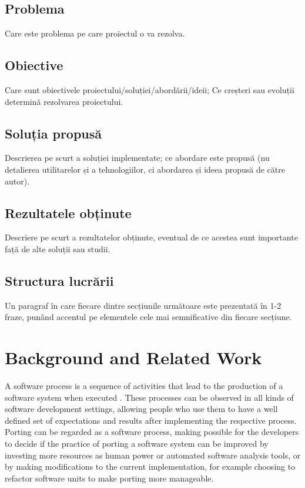 \documentclass[12pt,a4paper]{report}
\begin{document}
\section{Problema}
Care este problema pe care proiectul o va rezolva.
\section{Obiective}
Care sunt obiectivele proiectului/soluției/abordării/ideii; Ce creșteri sau evoluții determină rezolvarea proiectului.
\section{Soluția propusă}
Descrierea pe scurt a soluției implementate; ce abordare este propusă (nu detalierea utilitarelor și a tehnologiilor, ci abordarea și ideea propusă de către autor).
\section{Rezultatele obținute}
Descriere pe scurt a rezultatelor obținute, eventual de ce acestea sunt importante față de alte soluții sau studii.
\section{Structura lucrării}
Un paragraf în care fiecare dintre secțiunile următoare este prezentată în 1-2 fraze, punând accentul pe elementele cele mai semnificative din fiecare secțiune.



\chapter{Background and Related Work}

A software process is a sequence of activities that lead to the production of a software system
when executed \cite{humphrey1995discipline}. These processes can be observed in all kinds of
software development settings, allowing people who use them to have a well defined set of
expectations and results after implementing the respective process. Porting can be regarded as a
software process, making possible for the developers to decide if the practice of porting a software
system can be improved by investing more resources as human power or automated software analysis
tools, or by making modifications to the current implementation, for example choosing to refactor
software units to make porting more manageable.
\end{document}
